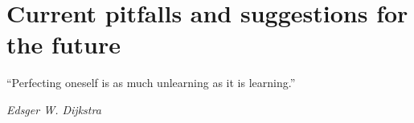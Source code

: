 \chapter{Current pitfalls and suggestions for the future}\label{chap:dolor}

\epigraph{``Perfecting oneself is as much unlearning as it is learning.''}{\textit{Edsger W. Dijkstra}}
